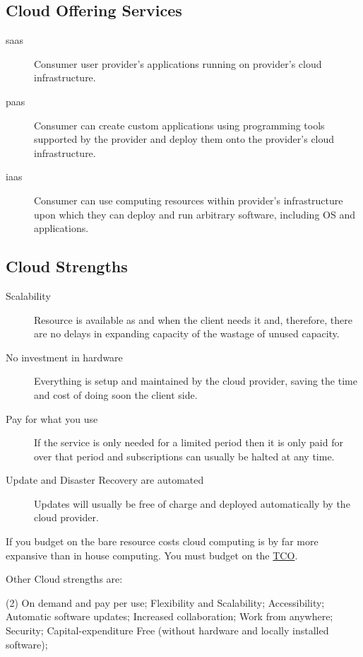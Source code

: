 \subsection{Cloud Offering Services}\label{sub:bd_cloud_offering_services} %
\begin{description}
    \item[\acf{saas}] Consumer user provider's applications running on provider's cloud infrastructure.
    \item[\acf{paas}] Consumer can create custom applications using programming tools supported by the provider and deploy them onto the provider's cloud infrastructure.
    \item[\acf{iaas}] Consumer can use computing resources within provider's infrastructure upon which they can deploy and run arbitrary software, including OS and applications.
\end{description}
%
\subsection{Cloud Strengths}\label{sub:bd_cloud_strengths} %
\begin{description}
    \item[Scalability] Resource is available as and when the client needs it and, therefore, there are no delays in expanding capacity of the wastage of unused capacity.
    \item[No investment in hardware] Everything is setup and maintained by the cloud provider, saving the time and cost of doing soon the client side.
    \item[Pay for what you use] If the service is only needed for a limited period then it is only paid for over that period and subscriptions can usually be halted at any time.
    \item[Update and Disaster Recovery are automated] Updates will usually be free of charge and deployed automatically by the cloud provider.
\end{description}
\begin{note}
    If you budget on the bare resource costs cloud computing is by far more expansive than in house computing.
    You must budget on the \hyperref[sub:ftt_total_cost_ownership]{TCO}.
\end{note}
Other Cloud strengths are:
\begin{tasks}(2)
    \task On demand and pay per use;
    \task Flexibility and Scalability;
    \task Accessibility;
    \task Automatic software updates;
    \task Increased collaboration;
    \task Work from anywhere;
    \task Security;
    \task Capital-expenditure Free (without hardware and locally installed software);
\end{tasks}
%
